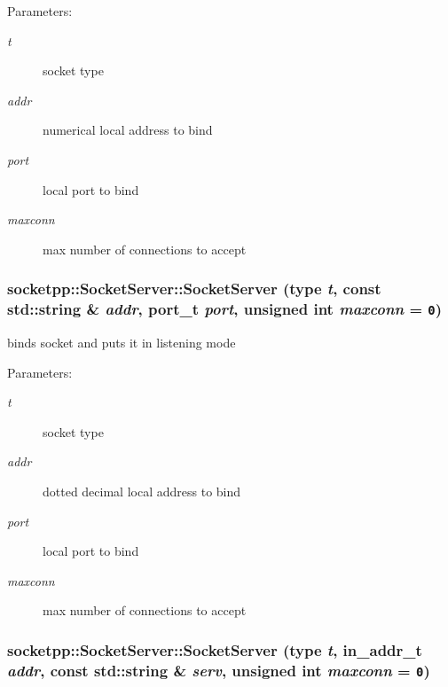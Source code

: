 \begin{Desc}
\item[Parameters:]
\begin{description}
\item[{\em t}]socket type \item[{\em addr}]numerical local address to bind \item[{\em port}]local port to bind \item[{\em maxconn}]max number of connections to accept \end{description}
\end{Desc}
\hypertarget{classsocketpp_1_1SocketServer_2b43397fd614dc7953559d7372f1c6ca}{
\subsubsection[{SocketServer}]{\setlength{\rightskip}{0pt plus 5cm}socketpp::SocketServer::SocketServer (type {\em t}, \/  const std::string \& {\em addr}, \/  port\_\-t {\em port}, \/  unsigned int {\em maxconn} = {\tt 0})}}
\label{classsocketpp_1_1SocketServer_2b43397fd614dc7953559d7372f1c6ca}


binds socket and puts it in listening mode 

\begin{Desc}
\item[Parameters:]
\begin{description}
\item[{\em t}]socket type \item[{\em addr}]dotted decimal local address to bind \item[{\em port}]local port to bind \item[{\em maxconn}]max number of connections to accept \end{description}
\end{Desc}
\hypertarget{classsocketpp_1_1SocketServer_d1c5c7df1da1c52df7a1fae7df4488b1}{
\subsubsection[{SocketServer}]{\setlength{\rightskip}{0pt plus 5cm}socketpp::SocketServer::SocketServer (type {\em t}, \/  in\_\-addr\_\-t {\em addr}, \/  const std::string \& {\em serv}, \/  unsigned int {\em maxconn} = {\tt 0})}}
\label{classsocketpp_1_1SocketServer_d1c5c7df1da1c52df7a1fae7df4488b1}


